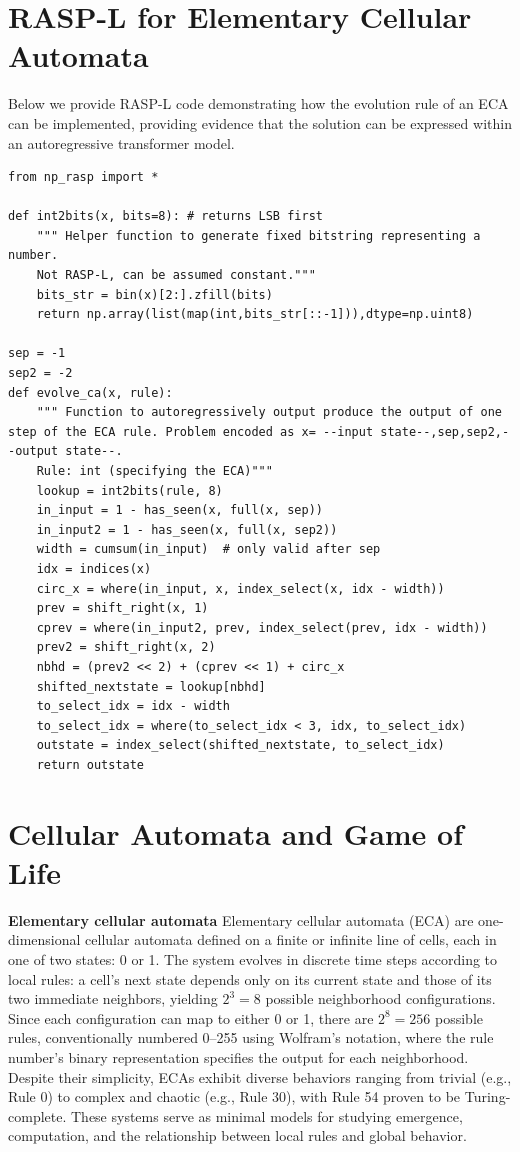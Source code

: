 \documentclass[twoside]{article}
\begin{document}
\section{RASP-L for Elementary Cellular Automata}
\label{app:rule30_rasp}
Below we provide RASP-L code \citep{zhou2023algorithms} demonstrating how the evolution rule of an ECA can be implemented, providing evidence that the solution can be expressed within an autoregressive transformer model.

\begin{lstlisting}[style=rasplstyle, caption={RASPL implementation of a cellular automaton evolution step}, label={lst:ca-evolve}]
from np_rasp import *

def int2bits(x, bits=8): # returns LSB first
    """ Helper function to generate fixed bitstring representing a number.
    Not RASP-L, can be assumed constant."""
    bits_str = bin(x)[2:].zfill(bits)
    return np.array(list(map(int,bits_str[::-1])),dtype=np.uint8)

sep = -1
sep2 = -2
def evolve_ca(x, rule):
    """ Function to autoregressively output produce the output of one step of the ECA rule. Problem encoded as x= --input state--,sep,sep2,--output state--.
    Rule: int (specifying the ECA)"""
    lookup = int2bits(rule, 8)
    in_input = 1 - has_seen(x, full(x, sep))
    in_input2 = 1 - has_seen(x, full(x, sep2))
    width = cumsum(in_input)  # only valid after sep
    idx = indices(x)
    circ_x = where(in_input, x, index_select(x, idx - width))
    prev = shift_right(x, 1)
    cprev = where(in_input2, prev, index_select(prev, idx - width))
    prev2 = shift_right(x, 2)
    nbhd = (prev2 << 2) + (cprev << 1) + circ_x
    shifted_nextstate = lookup[nbhd]
    to_select_idx = idx - width
    to_select_idx = where(to_select_idx < 3, idx, to_select_idx)
    outstate = index_select(shifted_nextstate, to_select_idx)
    return outstate
\end{lstlisting}

%
\section{Cellular Automata and Game of Life}\label{app:conway}
\textbf{Elementary cellular automata}
Elementary cellular automata (ECA) \citep{wolfram2003new} are one-dimensional cellular automata defined on a finite or infinite line of cells, each in one of two states: 0 or 1. The system evolves in discrete time steps according to local rules: a cell's next state depends only on its current state and those of its two immediate neighbors, yielding $2^3=8$ possible neighborhood configurations. Since each configuration can map to either 0 or 1, there are $2^8=256$ possible rules, conventionally numbered 0–255 using Wolfram's notation, where the rule number's binary representation specifies the output for each neighborhood. Despite their simplicity, ECAs exhibit diverse behaviors ranging from trivial (e.g., Rule 0) to complex and chaotic (e.g., Rule 30), with Rule 54 proven to be Turing-complete. These systems serve as minimal models for studying emergence, computation, and the relationship between local rules and global behavior.
\end{document}
